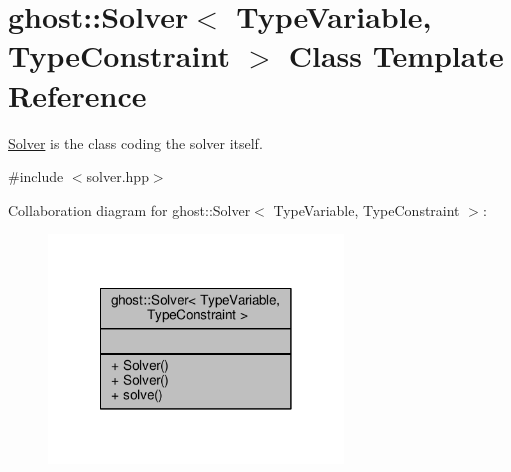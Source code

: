 \hypertarget{classghost_1_1Solver}{\section{ghost\-:\-:Solver$<$ Type\-Variable, Type\-Constraint $>$ Class Template Reference}
\label{classghost_1_1Solver}
}


\hyperlink{classghost_1_1Solver}{Solver} is the class coding the solver itself.  




{\ttfamily \#include $<$solver.\-hpp$>$}



Collaboration diagram for ghost\-:\-:Solver$<$ Type\-Variable, Type\-Constraint $>$\-:\nopagebreak
\begin{figure}[H]
\begin{center}
\leavevmode
\includegraphics[width=222pt]{classghost_1_1Solver__coll__graph}
\end{center}
\end{figure}
